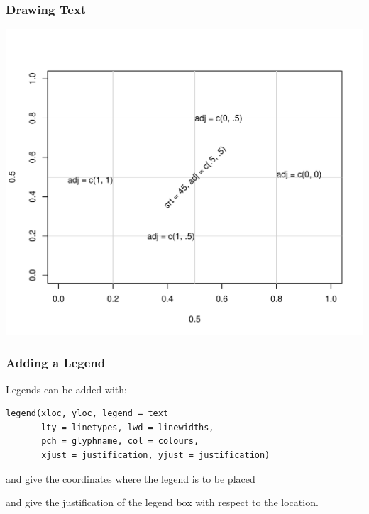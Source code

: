 \documentclass[12pt]{beamer}\usepackage[]{graphicx}\usepackage[]{color}
\newenvironment{knitrout}{}{} %
\begin{document}

\begin{frame}[fragile]
\frametitle{Drawing Text}
\begin{knitrout}\scriptsize
{}\color{fgcolor}

{\centering \includegraphics[width=.8\linewidth,height=.75\linewidth]{figure/draw_text-1} 

}



\end{knitrout}
\end{frame}


\begin{frame}[fragile]
\frametitle{Adding a Legend}

Legends can be added with:
\begin{verbatim}
legend(xloc, yloc, legend = text
       lty = linetypes, lwd = linewidths,
       pch = glyphname, col = colours,
       xjust = justification, yjust = justification)
\end{verbatim}

\bi
  \item {} and  give the coordinates where the legend is to be placed
  \item {} and  give
the justification of the legend box with respect to
the location. 
\ei

\end{frame}
\end{document}
